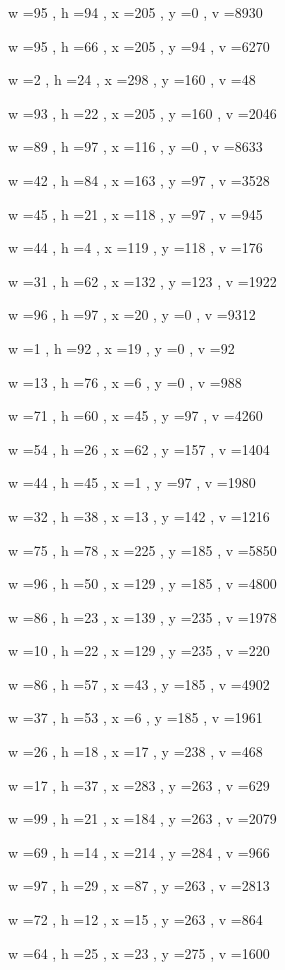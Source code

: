 \documentclass[11pt]{article}
\begin{document}
w =95 , h =94 , x =205 , y =0 , v =8930
\par
w =95 , h =66 , x =205 , y =94 , v =6270
\par
w =2 , h =24 , x =298 , y =160 , v =48
\par
w =93 , h =22 , x =205 , y =160 , v =2046
\par
w =89 , h =97 , x =116 , y =0 , v =8633
\par
w =42 , h =84 , x =163 , y =97 , v =3528
\par
w =45 , h =21 , x =118 , y =97 , v =945
\par
w =44 , h =4 , x =119 , y =118 , v =176
\par
w =31 , h =62 , x =132 , y =123 , v =1922
\par
w =96 , h =97 , x =20 , y =0 , v =9312
\par
w =1 , h =92 , x =19 , y =0 , v =92
\par
w =13 , h =76 , x =6 , y =0 , v =988
\par
w =71 , h =60 , x =45 , y =97 , v =4260
\par
w =54 , h =26 , x =62 , y =157 , v =1404
\par
w =44 , h =45 , x =1 , y =97 , v =1980
\par
w =32 , h =38 , x =13 , y =142 , v =1216
\par
w =75 , h =78 , x =225 , y =185 , v =5850
\par
w =96 , h =50 , x =129 , y =185 , v =4800
\par
w =86 , h =23 , x =139 , y =235 , v =1978
\par
w =10 , h =22 , x =129 , y =235 , v =220
\par
w =86 , h =57 , x =43 , y =185 , v =4902
\par
w =37 , h =53 , x =6 , y =185 , v =1961
\par
w =26 , h =18 , x =17 , y =238 , v =468
\par
w =17 , h =37 , x =283 , y =263 , v =629
\par
w =99 , h =21 , x =184 , y =263 , v =2079
\par
w =69 , h =14 , x =214 , y =284 , v =966
\par
w =97 , h =29 , x =87 , y =263 , v =2813
\par
w =72 , h =12 , x =15 , y =263 , v =864
\par
w =64 , h =25 , x =23 , y =275 , v =1600
\par
\newpage
\end{document}
